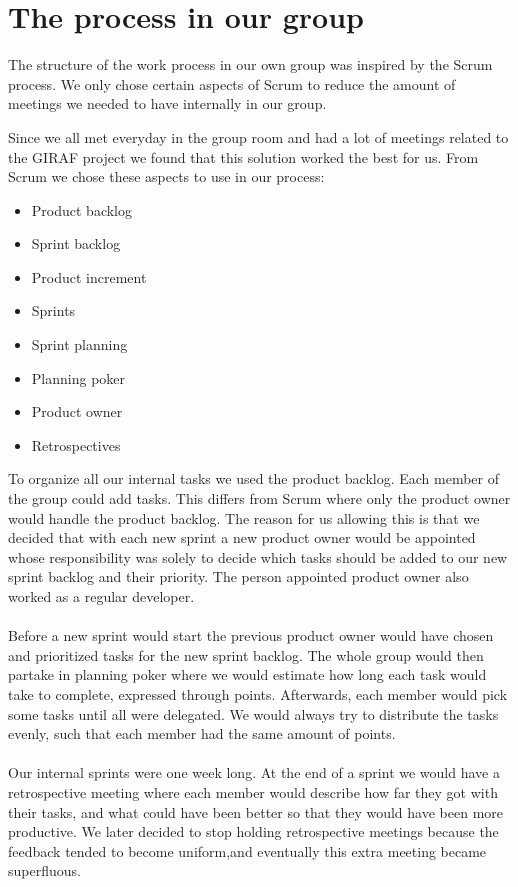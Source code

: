 \section{The process in our group} \label{intro:the-process-in-our-group}
The structure of the work process in our own group was inspired by the Scrum process.
We only chose certain aspects of Scrum to reduce the amount of meetings we needed to have internally in our group. 

Since we all met everyday in the group room and had a lot of meetings related to the GIRAF project we found that this solution worked the best for us.
From Scrum we chose these aspects to use in our process:

 \begin{itemize}
    \item Product backlog
    \item Sprint backlog
    \item Product increment
    \item Sprints
    \item Sprint planning
    \item Planning poker
    \item Product owner
    \item Retrospectives
 \end{itemize}
To organize all our internal tasks we used the product backlog.
Each member of the group could add tasks.
This differs from Scrum where only the product owner would handle the product backlog.
The reason for us allowing this is that we decided that with each new sprint a new product owner would be appointed whose responsibility was solely to decide which tasks should be added to our new sprint backlog and their priority.
The person appointed product owner also worked as a regular developer.
\\\\
Before a new sprint would start the previous product owner would have chosen and prioritized tasks for the new sprint backlog.
The whole group would then partake in planning poker where we would estimate how long each task would take to complete, expressed through points.
Afterwards, each member would pick some tasks until all were delegated.
We would always try to distribute the tasks evenly, such that each member had the same amount of points.
\\\\
Our internal sprints were one week long.
At the end of a sprint we would have a retrospective meeting where each member would describe how far they got with their tasks, and what could have been better so that they would have been more productive.
We later decided to stop holding retrospective meetings because the feedback tended to become uniform,and eventually this extra meeting became superfluous.


